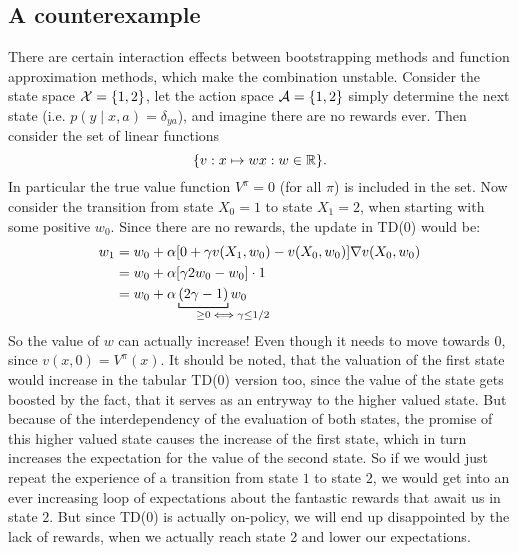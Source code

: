 \subsection{A counterexample}

There are certain interaction effects between bootstrapping methods and function approximation methods, which make the combination unstable. Consider the state space \(\mathcal{X}=\{1,2\}\), let the action space \(\mathcal{A}=\{1,2\}\) simply determine the next state (i.e. \(p(y\mid x,a)=\delta_{ya} \)), and imagine there are no rewards ever. Then consider the set of linear functions
\[
	\{v:x\mapsto w x :w\in\mathbb{R}\}.
\] 
In particular the true value function \(V^\pi=0\) (for all \(\pi\)) is included in the set. Now consider the transition from state \(X_0=1\) to state \(X_1=2\), when starting with some positive \(w_0\). Since there are no rewards, the update in TD(0) would be:
\begin{align*}
	w_1 
	&= w_0 + \alpha [0+\gamma v(X_1,w_0) - v(X_0,w_0)] \nabla v(X_0,w_0)\\
	&=w_0 + \alpha[\gamma 2w_0 - w_0] \cdot 1\\
	&=w_0 + \alpha \underbracket[0.7pt]{(2\gamma -1)}_{\ge 0 \mathrlap{\iff \gamma \le 1/2}} w_0
\end{align*}
So the value of \(w\) can actually increase! Even though it needs to move towards 0, since \(v(x,0)=V^\pi(x)\). It should be noted, that the valuation of the first state would increase in the tabular TD(0) version too, since the value of the state gets boosted by the fact, that it serves as an entryway to the higher valued state. But because of the interdependency of the evaluation of both states, the promise of this higher valued state causes the increase of the first state, which in turn increases the expectation for the value of the second state. So if we would just repeat the experience of a transition from state \(1\) to state \(2\), we would get into an ever increasing loop of expectations about the fantastic rewards that await us in state \(2\). But since TD(0) is actually on-policy, we will end up disappointed by the lack of rewards, when we actually reach state 2 and lower our expectations. 

